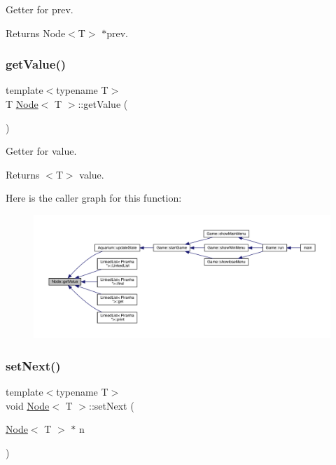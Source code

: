 Getter for prev. 

\begin{DoxyReturn}{Returns}
Node$<$\+T$>$ $\ast$prev. 
\end{DoxyReturn}
\mbox{\label{class_node_a8a9d6500c263a8338c1b763f44f8dadd}} 
\subsubsection{\texorpdfstring{get\+Value()}{getValue()}}
{\footnotesize\ttfamily template$<$typename T$>$ \\
T \mbox{\hyperlink{class_node}{Node}}$<$ T $>$\+::get\+Value (\begin{DoxyParamCaption}{ }\end{DoxyParamCaption})\hspace{0.3cm}{\ttfamily [inline]}}



Getter for value. 

\begin{DoxyReturn}{Returns}
$<$\+T$>$ value. 
\end{DoxyReturn}
Here is the caller graph for this function\+:
\nopagebreak
\begin{figure}[H]
\begin{center}
\leavevmode
\includegraphics[width=350pt]{class_node_a8a9d6500c263a8338c1b763f44f8dadd_icgraph}
\end{center}
\end{figure}
\mbox{\label{class_node_a1ef90ff513d88f99b7a7c49d916ac6ea}} 
\subsubsection{\texorpdfstring{set\+Next()}{setNext()}}
{\footnotesize\ttfamily template$<$typename T$>$ \\
void \mbox{\hyperlink{class_node}{Node}}$<$ T $>$\+::set\+Next (\begin{DoxyParamCaption}\item[{\mbox{\hyperlink{class_node}{Node}}$<$ T $>$ $\ast$}]{n }\end{DoxyParamCaption})\hspace{0.3cm}{\ttfamily [inline]}}



